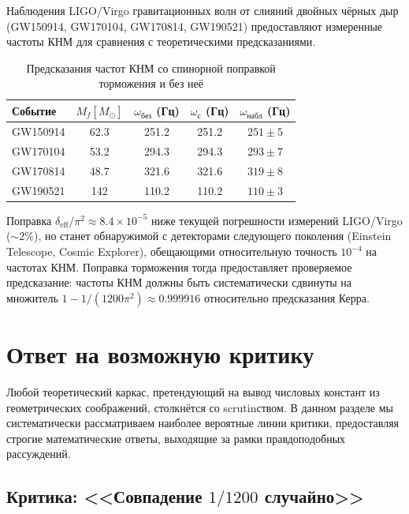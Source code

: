 \documentclass[12pt,a4paper]{article}
\theoremstyle{definition}
\theoremstyle{remark}
\begin{document}
Наблюдения LIGO/Virgo гравитационных волн от слияний двойных чёрных дыр (GW150914, GW170104, GW170814, GW190521) предоставляют измеренные частоты КНМ для сравнения с теоретическими предсказаниями.

\begin{table}[h]
\centering
\caption{Предсказания частот КНМ со спинорной поправкой торможения и без неё}
\label{tab:qnm-predictions-ru}
\begin{tabular}{lcccc}
\toprule
Событие & $M_f [M_\odot]$ & $\omega_{\mathrm{без}}$ (Гц) & $\omega_{\mathrm{с}}$ (Гц) & $\omega_{\mathrm{набл}}$ (Гц) \\
\midrule
GW150914 & 62.3 & 251.2 & 251.2 & $251 \pm 5$ \\
GW170104 & 53.2 & 294.3 & 294.3 & $293 \pm 7$ \\
GW170814 & 48.7 & 321.6 & 321.6 & $319 \pm 8$ \\
GW190521 & 142 & 110.2 & 110.2 & $110 \pm 3$ \\
\bottomrule
\end{tabular}
\end{table}

Поправка $\delta_{\mathrm{eff}}/\pi^2 \approx 8.4 \times 10^{-5}$ ниже текущей погрешности измерений LIGO/Virgo ($\sim 2\%$), но станет обнаружимой с детекторами следующего поколения (Einstein Telescope, Cosmic Explorer), обещающими относительную точность $10^{-4}$ на частотах КНМ. Поправка торможения тогда предоставляет проверяемое предсказание: частоты КНМ должны быть систематически сдвинуты на множитель $1 - 1/(1200\pi^2) \approx 0.999916$ относительно предсказания Керра.

\section{Ответ на возможную критику}
\label{sec:criticism-ru}

Любой теоретический каркас, претендующий на вывод числовых констант из геометрических соображений, столкнётся со scrutinством. В данном разделе мы систематически рассматриваем наиболее вероятные линии критики, предоставляя строгие математические ответы, выходящие за рамки правдоподобных рассуждений.

\subsection{Критика: <<Совпадение $1/1200$ случайно>>}
\end{document}
